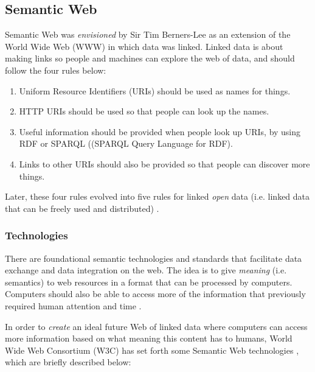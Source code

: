 \documentclass{article}
\begin{document}
\subsection{Semantic Web}
Semantic Web was \emph{envisioned} by Sir Tim Berners-Lee as an extension of the World Wide Web (WWW) in which data was linked. Linked data is about making links so people and machines can explore the web of data, and should follow the four rules \cite{tim_berners-lee_linked_nodate} below: 

\begin{enumerate}
    \item Uniform Resource Identifiers (URIs) should be used as names for things.
    \item HTTP URIs should be used so that people can look up the names.
    \item Useful information should be provided when people look up URIs, by using RDF or SPARQL ((SPARQL Query Language for RDF).
    \item Links to other URIs should also be provided so that people can discover more things.
\end{enumerate}

Later, these four rules evolved into five rules for linked \emph{open} data (i.e. linked data that can be freely used and distributed) \cite{noauthor_5_nodate}.  

\subsubsection{Technologies}\label{subsubsec:Technologies}
There are foundational semantic technologies and standards that facilitate data exchange and data integration on the web. The idea is to give \emph{meaning} (i.e. semantics) to web resources in a format that can be processed by computers. Computers should also be able to access more of the information that previously required human attention and time \cite{hitzler_foundations_2009}.

In order to \emph{create} an ideal future Web of linked data where computers can access more information based on what meaning this content has to humans, World Wide Web Consortium (W3C) has set forth some Semantic Web technologies \cite{noauthor_semantic_nodate-1}, which are briefly described below:
\end{document}
